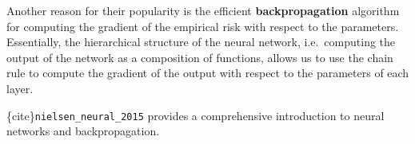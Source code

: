Another reason for their popularity is the efficient
\textbf{backpropagation} algorithm for computing the gradient of the
empirical risk with respect to the parameters. Essentially, the
hierarchical structure of the neural network, i.e.~computing the output
of the network as a composition of functions, allows us to use the chain
rule to compute the gradient of the output with respect to the
parameters of each layer.

\{cite\}\texttt{nielsen\_neural\_2015} provides a comprehensive
introduction to neural networks and backpropagation.

